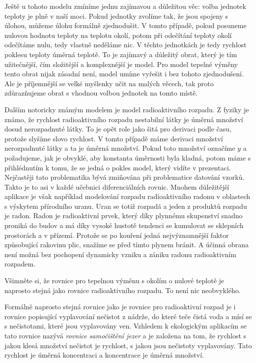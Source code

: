 \documentclass[12pt]{article}
\begin{document}
Ještě u tohoto modelu zmíníme jednu zajímavou a důležitou věc: volba jednotek teploty je plně v naší moci. Pokud jednotky zvolíme tak, že jsou spojeny s úlohou, můžeme úlohu formálně zjednodušit. V tomto případě, pokud posuneme nulovou hodnotu teploty na teplotu okolí, potom při odečítání teploty okolí odečítáme nulu, tedy vlastně neděláme nic. V těchto jednotkách je tedy rychlost poklesu teploty úměrná teplotě. To je zajímavý a důležitý obrat, který je tím užitečnější, čím složitější a komplexnější je model. Pro model tepelné výměny tento obrat nijak zásadní není, model umíme vyřešit i bez tohoto zjednodušení. Ale je příjemnější se velké myšlenky učit na malých věcech, tak proto zdůrazňujeme obrat s vhodnou volbou jednotek na tomto místě.

Dalším notoricky známým modelem je model radioaktivního rozpadu. Z fyziky je známo, že rychlost radioaktivního rozpadu nestabilní látky je úměrná množství dosud nerozpadnuté látky. To je opět role jako šitá pro derivaci podle času, protože slyšíme slovo rychlost. V tomto případě máme derivaci množství nerozpadnuté látky a ta je úměrná množství. Pokud toto množství označíme $y$ a požadujeme, jak je obvyklé, aby konstanta úměrnosti byla kladná, potom máme s přihlédnutím k tomu, že se jedná o pokles model, který vidíte v prezentaci. Nejčastěji tato problematika bývá zmiňována při problematice datování vzorků. Takto je to asi v každé učebnici diferenciálních rovnic. Mnohem důležitější aplikace je však například modelování rozpadu radioaktivního radonu v oblastech s výskytem přírodního uranu. Uran se totiž rozpadá a jeden z produktů rozpadu je radon. Radon je radioaktivní prvek, který díky plynnému skupenství snadno proniká do budov a má díky vysoké hustotě tendenci se kumulovat se sklepních prostorách a v přízemí. Protože se po kouření jedná  nejvýznamnější faktor způsobující rakovinu plic, snažíme se před tímto plynem bránit. A účinná obrana není možná bez pochopení dynamicky vzniku a zániku radonu radioaktivním rozpadem.

Všimněte si, že rovnice pro tepelnou výměnu s okolím o nulové teplotě je naprosto stejná jako rovnice radioaktivního rozpadu. To není nic neobvyklého.

Formálně naprosto stejná rovnice jako je rovnice pro radioaktivní rozpad je i rovnice popisující vyplavování nečistot z nádrže, do které teče čistá voda a mísí se s nečistotami, které jsou vyplavovány ven. Vzhledem k ekologickým aplikacím se tato rovnice nazývá \textit{rovnice samočištění jezer} a je založena na tom, že rychlost s jakou klesá množství nečistot je rychlost, s jakou jsou nečistoty vyplavovány. Tato rychlost je úměrná koncentraci a koncentrace je úměrná množství.
\end{document}
